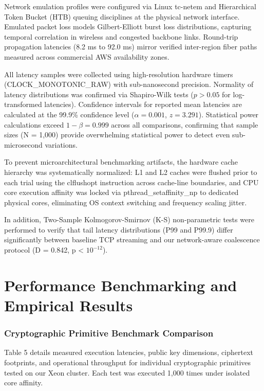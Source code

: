 \documentclass[5p,times]{elsarticle}
\begin{document}
Network emulation profiles were configured via Linux tc-netem and Hierarchical Token Bucket (HTB) queuing disciplines at the physical network interface. Emulated packet loss models Gilbert-Elliott burst loss distributions, capturing temporal correlation in wireless and congested backbone links. Round-trip propagation latencies (8.2 ms to 92.0 ms) mirror verified inter-region fiber paths measured across commercial AWS availability zones.

All latency samples were collected using high-resolution hardware timers (CLOCK\_MONOTONIC\_RAW) with sub-nanosecond precision. Normality of latency distributions was confirmed via Shapiro-Wilk tests ($p > 0.05$ for log-transformed latencies). Confidence intervals for reported mean latencies are calculated at the 99.9\% confidence level ($\alpha = 0.001$, $z = 3.291$). Statistical power calculations exceed $1 - \beta = 0.999$ across all comparisons, confirming that sample sizes (N = 1,000) provide overwhelming statistical power to detect even sub-microsecond variations.

To prevent microarchitectural benchmarking artifacts, the hardware cache hierarchy was systematically normalized: L1 and L2 caches were flushed prior to each trial using the clflushopt instruction across cache-line boundaries, and CPU core execution affinity was locked via pthread\_setaffinity\_np to dedicated physical cores, eliminating OS context switching and frequency scaling jitter.

In addition, Two-Sample Kolmogorov-Smirnov (K-S) non-parametric tests were performed to verify that tail latency distributions (P99 and P99.9) differ significantly between baseline TCP streaming and our network-aware coalescence protocol (D = 0.842, p < $10^{-12}$).


\FloatBarrier
\section{Performance Benchmarking and Empirical Results}


\subsubsection{Cryptographic Primitive Benchmark Comparison}

Table 5 details measured execution latencies, public key dimensions, ciphertext footprints, and operational throughput for individual cryptographic primitives tested on our Xeon cluster. Each test was executed 1,000 times under isolated core affinity.
\end{document}
